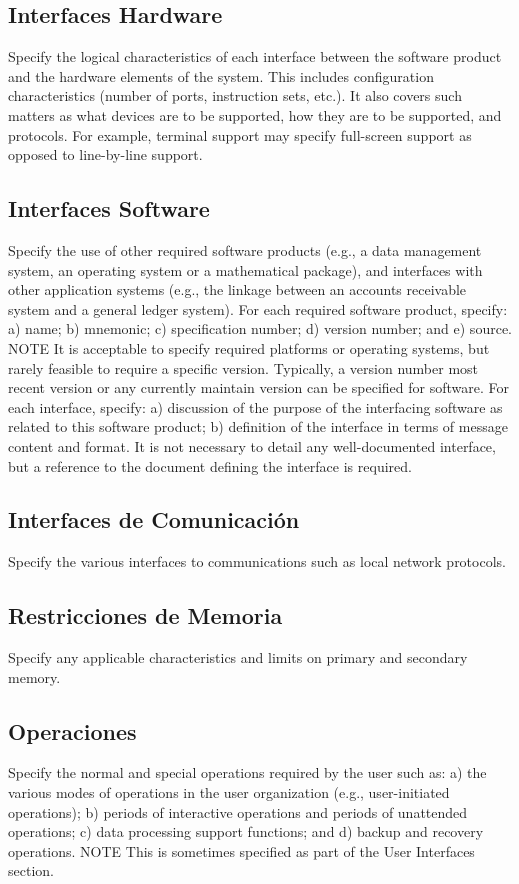 \documentclass[12pt, a4paper, twoside]{article}
\begin{document}
 \subsection{Interfaces Hardware}
 Specify the logical characteristics of each interface between the software product and the hardware
 elements of the system. This includes configuration characteristics (number of ports, instruction sets,
 etc.). It also covers such matters as what devices are to be supported, how they are to be supported, and
 protocols. For example, terminal support may specify full-screen support as opposed to line-by-line
 support.

 \subsection{Interfaces Software}
 Specify the use of other required software products (e.g., a data management system, an operating
 system or a mathematical package), and interfaces with other application systems (e.g., the linkage
 between an accounts receivable system and a general ledger system).
 For each required software product, specify:
 a) name;
 b) mnemonic;
 c) specification number;
 d) version number; and
 e) source.
 NOTE It is acceptable to specify required platforms or operating systems, but rarely feasible to require a
 specific version. Typically, a version number most recent version or any currently maintain version can be
 specified for software.
 For each interface, specify:
 a) discussion of the purpose of the interfacing software as related to this software product;
 b) definition of the interface in terms of message content and format. It is not necessary to detail any
 well-documented interface, but a reference to the document defining the interface is required.

 \subsection{Interfaces de Comunicación}
 Specify the various interfaces to communications such as local network protocols.

 \subsection{Restricciones de Memoria}
 Specify any applicable characteristics and limits on primary and secondary memory.

 \subsection{Operaciones}
 Specify the normal and special operations required by the user such as:
 a) the various modes of operations in the user organization (e.g., user-initiated operations);
 b) periods of interactive operations and periods of unattended operations;
 c) data processing support functions; and
 d) backup and recovery operations.
 NOTE This is sometimes specified as part of the User Interfaces section.
\end{document}
